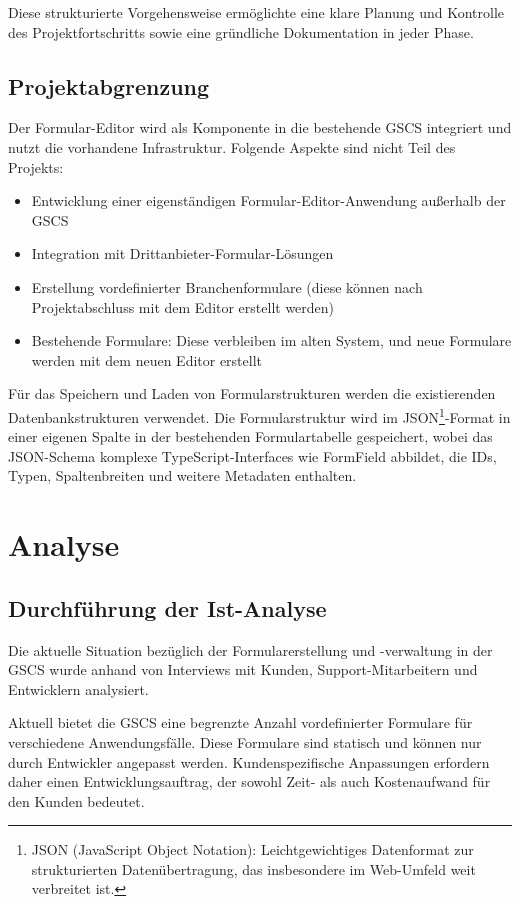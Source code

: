 \documentclass[a4paper,11pt]{article}
\begin{document}
\noindent Diese strukturierte Vorgehensweise ermöglichte eine klare Planung und Kontrolle des Projektfortschritts sowie eine gründliche Dokumentation in jeder Phase.

\subsection{Projektabgrenzung}
Der Formular-Editor wird als Komponente in die bestehende GSCS integriert und nutzt die vorhandene Infrastruktur. Folgende Aspekte sind nicht Teil des Projekts:

\begin{itemize}
  \item Entwicklung einer eigenständigen Formular-Editor-Anwendung außerhalb der GSCS
  \item Integration mit Drittanbieter-Formular-Lösungen
  \item Erstellung vordefinierter Branchenformulare (diese können nach Projektabschluss mit dem Editor erstellt werden)
  \item Bestehende Formulare: Diese verbleiben im alten System, und neue Formulare werden mit dem neuen Editor erstellt
\end{itemize}

\noindent Für das Speichern und Laden von Formularstrukturen werden die existierenden Datenbankstrukturen verwendet. Die Formularstruktur wird im JSON\footnote{JSON (JavaScript Object Notation): Leichtgewichtiges Datenformat zur strukturierten Datenübertragung, das insbesondere im Web-Umfeld weit verbreitet ist.}-Format in einer eigenen Spalte in der bestehenden Formulartabelle gespeichert, wobei das JSON-Schema komplexe TypeScript-Interfaces wie FormField abbildet, die IDs, Typen, Spaltenbreiten und weitere Metadaten enthalten.


\section{Analyse}
\subsection{Durchführung der Ist-Analyse}
Die aktuelle Situation bezüglich der Formularerstellung und -verwaltung in der GSCS wurde anhand von Interviews mit Kunden, Support-Mitarbeitern und Entwicklern analysiert.

\noindent Aktuell bietet die GSCS eine begrenzte Anzahl vordefinierter Formulare für verschiedene Anwendungsfälle. Diese Formulare sind statisch und können nur durch Entwickler angepasst werden. Kundenspezifische Anpassungen erfordern daher einen Entwicklungsauftrag, der sowohl Zeit- als auch Kostenaufwand für den Kunden bedeutet.
\end{document}

